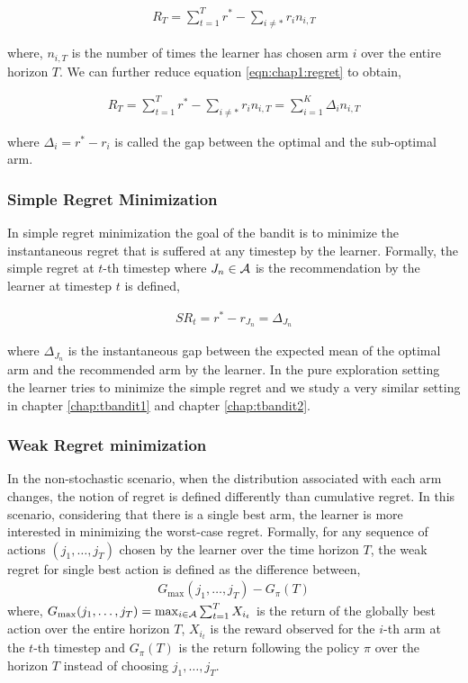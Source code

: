 \begin{eqnarray}
R_{T} = \sum_{t=1}^{T}r^* - \sum_{i\neq *}r_{i}n_{i,T} \label{eqn:chap1:regret}
\end{eqnarray}

where, $n_{i,T}$ is the number of times the learner has chosen arm $i$ over the entire horizon $T$. We can further reduce equation \ref{eqn:chap1:regret} to obtain,

\begin{align*}
R_{T} = \sum_{t=1}^{T}r^* - \sum_{i\neq *}r_{i}n_{i,T} = \sum_{i=1}^{K}\Delta_{i}n_{i,T}
\end{align*}

where $\Delta_{i}=r^* - r_i$ is called the gap between the optimal and the sub-optimal arm.

\subsubsection{Simple Regret Minimization}
In simple regret minimization the goal of the bandit is to minimize the instantaneous regret that is suffered at any  timestep by the learner. Formally, the simple regret at $t$-th timestep where $J_n\in\mathcal{A}$ is the recommendation by the learner at timestep $t$ is defined,

\begin{align*}
SR_{t} = r^* - r_{J_{n}} = \Delta_{J_n}
\end{align*}

where $\Delta_{J_n}$ is the instantaneous gap between the expected mean of the optimal arm and the recommended arm by the learner. In the pure exploration setting the learner tries to minimize the simple regret and we study a very similar setting in chapter \ref{chap:tbandit1} and chapter \ref{chap:tbandit2}. 

\subsubsection{Weak Regret minimization}
In the non-stochastic scenario, when the distribution associated with each arm changes, the notion of regret is defined differently than cumulative regret. In this scenario, considering that there is a single best arm, the learner is more interested in minimizing the worst-case regret. Formally, for any sequence of actions $\left( j_1, \ldots , j_T \right)$ chosen by the learner over the time horizon $T$, the weak regret for single best action is defined as the difference between,
\begin{align*}
G_{\max}(j_1,\ldots,j_T) - G_{\pi}(T)
\end{align*}
where, $G_{\max}(j_1,\ldots,j_T) = \max_{i\in\mathcal{A}}\sum_{t=1}^{T}X_{i_t}$ is the return of the globally best action over the entire horizon $T$, $X_{i_t}$ is the reward observed for the $i$-th arm at the $t$-th timestep and $G_{\pi}(T)$ is the return following the policy $\pi$ over the horizon $T$ instead of choosing $j_1,\ldots,j_T$.

